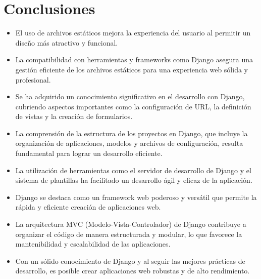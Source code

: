 \documentclass{article}
\begin{document}
  \section{Conclusiones}
  \begin{itemize}
    \item El uso de archivos estáticos mejora la experiencia del usuario al permitir un diseño más atractivo y funcional.
    \item La compatibilidad con herramientas y frameworks como Django asegura una gestión eficiente de los archivos estáticos 
    para una experiencia web sólida y profesional.
    \item Se ha adquirido un conocimiento significativo en el desarrollo con Django, cubriendo aspectos importantes como 
    la configuración de URL, la definición de vistas y la creación de formularios.
    \item La comprensión de la estructura de los proyectos en Django, que incluye la organización de aplicaciones, modelos 
    y archivos de configuración, resulta fundamental para lograr un desarrollo eficiente.
    \item La utilización de herramientas como el servidor de desarrollo de Django y el sistema de plantillas ha facilitado 
    un desarrollo ágil y eficaz de la aplicación.
    \item Django se destaca como un framework web poderoso y versátil que permite la rápida y eficiente creación de aplicaciones web.
    \item La arquitectura MVC (Modelo-Vista-Controlador) de Django contribuye a organizar el código de manera estructurada y 
    modular, lo que favorece la mantenibilidad y escalabilidad de las aplicaciones.
    \item Con un sólido conocimiento de Django y al seguir las mejores prácticas de desarrollo, es posible crear aplicaciones 
    web robustas y de alto rendimiento.
  \end{itemize}
  
	\newpage
\end{document}
